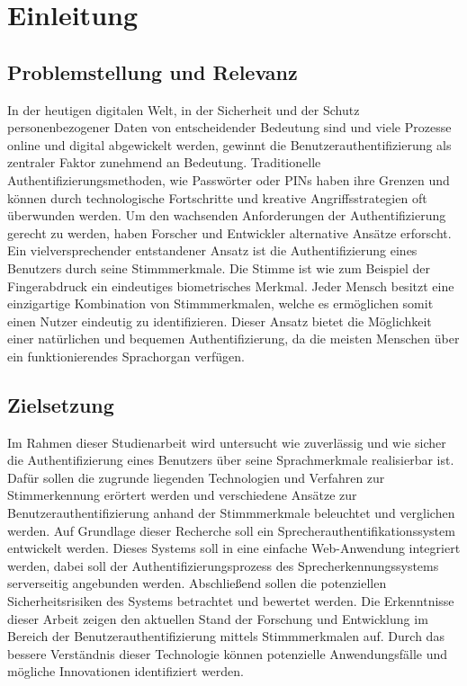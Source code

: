 \section{Einleitung}
\subsection{Problemstellung und Relevanz}
In der heutigen digitalen Welt, in der Sicherheit und der Schutz personenbezogener Daten von entscheidender Bedeutung sind und viele Prozesse online und digital abgewickelt werden, gewinnt die Benutzerauthentifizierung als zentraler Faktor zunehmend an Bedeutung.
Traditionelle Authentifizierungsmethoden, wie Passwörter oder PINs haben ihre Grenzen und können durch technologische Fortschritte und kreative Angriffsstrategien oft überwunden werden.
Um den wachsenden Anforderungen der Authentifizierung gerecht zu werden, haben Forscher und Entwickler alternative Ansätze erforscht.
\newparagraph
Ein vielversprechender entstandener Ansatz ist die Authentifizierung eines Benutzers durch seine Stimmmerkmale.
Die Stimme ist wie zum Beispiel der Fingerabdruck ein eindeutiges biometrisches Merkmal.
Jeder Mensch besitzt eine einzigartige Kombination von Stimmmerkmalen, welche es ermöglichen somit einen Nutzer eindeutig zu identifizieren.
Dieser Ansatz bietet die Möglichkeit einer natürlichen und bequemen Authentifizierung, da die meisten Menschen über ein funktionierendes Sprachorgan verfügen.

\subsection{Zielsetzung}
Im Rahmen dieser Studienarbeit wird untersucht wie zuverlässig und wie sicher die Authentifizierung eines Benutzers über seine Sprachmerkmale realisierbar ist.
Dafür sollen die zugrunde liegenden Technologien und Verfahren zur Stimmerkennung erörtert werden und verschiedene Ansätze zur Benutzerauthentifizierung anhand der Stimmmerkmale beleuchtet und verglichen werden.
Auf Grundlage dieser Recherche soll ein Sprecherauthentifikationssystem entwickelt werden.
Dieses Systems soll in eine einfache Web-Anwendung integriert werden, dabei soll der Authentifizierungsprozess des Sprecherkennungssystems serverseitig angebunden werden.
Abschließend sollen die potenziellen Sicherheitsrisiken des Systems betrachtet und bewertet werden.
Die Erkenntnisse dieser Arbeit zeigen den aktuellen Stand der Forschung und Entwicklung im Bereich der Benutzerauthentifizierung mittels Stimmmerkmalen auf.
Durch das bessere Verständnis dieser Technologie können potenzielle Anwendungsfälle und mögliche Innovationen identifiziert werden.

